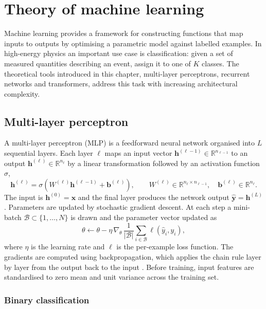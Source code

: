 \chapter{Theory of machine learning}
\label{chap:ml}

Machine learning provides a framework for constructing functions that map inputs to outputs by optimising a parametric model against labelled examples.  In high-energy physics an important use case is classification: given a set of measured quantities describing an event, assign it to one of $K$ classes.  The theoretical tools introduced in this chapter, multi-layer perceptrons, recurrent networks and transformers, address this task with increasing architectural complexity.

\section{Multi-layer perceptron}

A multi-layer perceptron (MLP) is a feedforward neural network organised into $L$ sequential layers.  Each layer $\ell$ maps an input vector $\mathbf{h}^{(\ell-1)}\in\mathbb{R}^{n_{\ell-1}}$ to an output $\mathbf{h}^{(\ell)}\in\mathbb{R}^{n_{\ell}}$ by a linear transformation followed by an activation function $\sigma$,
\begin{equation}
\mathbf{h}^{(\ell)} = \sigma\!\left(W^{(\ell)}\mathbf{h}^{(\ell-1)} + \mathbf{b}^{(\ell)}\right), \qquad W^{(\ell)}\in\mathbb{R}^{n_{\ell}\times n_{\ell-1}},\quad \mathbf{b}^{(\ell)}\in\mathbb{R}^{n_{\ell}}.
\end{equation}
The input is $\mathbf{h}^{(0)}=\mathbf{x}$ and the final layer produces the network output $\hat{\mathbf{y}}=\mathbf{h}^{(L)}$. Parameters are updated by stochastic gradient descent.  At each step a mini-batch $\mathcal{B}\subset\{1,\dots,N\}$ is drawn and the parameter vector updated as
\begin{equation}
\theta \leftarrow \theta - \eta\,\nabla_{\theta}\, \frac{1}{|\mathcal{B}|}\sum_{i\in\mathcal{B}}\ell(\hat{y}_i,y_i),
\end{equation}
where $\eta$ is the learning rate and $\ell$ is the per-example loss function.  The gradients are computed using backpropagation, which applies the chain rule layer by layer from the output back to the input \cite{Rumelhart_Backprop_1986}. Before training, input features are standardised to zero mean and unit variance across the training set.

\subsection{Binary classification}
\label{sec:binary}

